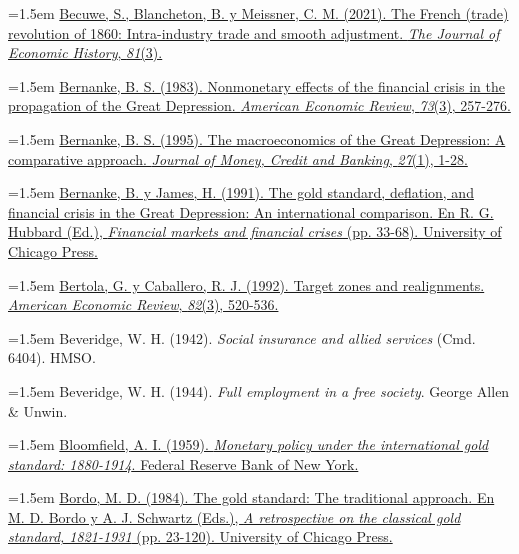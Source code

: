 \documentclass[10pt,a4paper]{article}
\begin{document}
{\sloppy\noindent\hangindent=1.5em \href{https://escholarship.org/content/qt1g3493z7/qt1g3493z7.pdf}{Becuwe, S., Blancheton, B. y Meissner, C. M. (2021). The French (trade) revolution of 1860: Intra-industry trade and smooth adjustment. \textit{The Journal of Economic History}, \textit{81}(3).}\par}

{\sloppy\noindent\hangindent=1.5em \href{https://ideas.repec.org/a/aea/aecrev/v73y1983i3p257-76.html}{Bernanke, B. S. (1983). Nonmonetary effects of the financial crisis in the propagation of the Great Depression. \textit{American Economic Review}, \textit{73}(3), 257-276.}\par}

{\sloppy\noindent\hangindent=1.5em \href{https://ideas.repec.org/a/mcb/jmoncb/v27y1995i1p1-28.html}{Bernanke, B. S. (1995). The macroeconomics of the Great Depression: A comparative approach. \textit{Journal of Money, Credit and Banking}, \textit{27}(1), 1-28.}\par}

{\sloppy\noindent\hangindent=1.5em \href{https://www.nber.org/system/files/chapters/c11482/c11482.pdf}{Bernanke, B. y James, H. (1991). The gold standard, deflation, and financial crisis in the Great Depression: An international comparison. En R. G. Hubbard (Ed.), \textit{Financial markets and financial crises} (pp. 33-68). University of Chicago Press.}\par}

{\sloppy\noindent\hangindent=1.5em \href{https://ideas.repec.org/a/aea/aecrev/v82y1992i3p520-36.html}{Bertola, G. y Caballero, R. J. (1992). Target zones and realignments. \textit{American Economic Review}, \textit{82}(3), 520-536.}\par}

\noindent\hangindent=1.5em Beveridge, W. H. (1942). \textit{Social insurance and allied services} (Cmd. 6404). HMSO.

\noindent\hangindent=1.5em Beveridge, W. H. (1944). \textit{Full employment in a free society}. George Allen \& Unwin.

{\sloppy\noindent\hangindent=1.5em \href{https://fraser.stlouisfed.org/title/6025}{Bloomfield, A. I. (1959). \textit{Monetary policy under the international gold standard: 1880-1914}. Federal Reserve Bank of New York.}\par}

{\sloppy\noindent\hangindent=1.5em \href{https://www.nber.org/books/bord84-1}{Bordo, M. D. (1984). The gold standard: The traditional approach. En M. D. Bordo y A. J. Schwartz (Eds.), \textit{A retrospective on the classical gold standard, 1821-1931} (pp. 23-120). University of Chicago Press.}\par}
\end{document}
